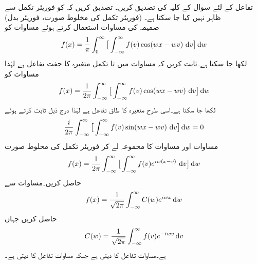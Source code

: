 \quad
تفاعل  کے لئے سوال  کے کلیہ کی تصدیق کریں۔ 
\quad
تصدیق کریں کہ  کو فوریئر تکمل سے ظاہر نہیں کیا جا سکتا ہے۔
\quad (فوریئر تکمل کی مخلوط صورت، فوریئر بدل)\\
ضمیمہ  کی مساوات  استعمال کرتے ہوئے مساوات  کو
\begin{align}\label{مساوات_فوریئر_بدل_الف}
f(x)=\frac{1}{\pi}\int_{0}^{\infty} \big[\int_{-\infty}^{\infty} f(v)\cos(wx-wv)\,\dif v\big]\dif w
\end{align}
لکھا جا سکتا ہے۔ثابت کریں کہ مساوات  میں  تا  تکمل متغیرہ  کا جفت تفاعل ہے لہٰذا مساوات  کو
\begin{align}\label{مساوات_فوریئر_بدل_ب}
f(x)=\frac{1}{2\pi}\int_{-\infty}^{\infty} \big[\int_{-\infty}^{\infty} f(v)\cos(wx-wv)\,\dif v\big]\dif w
\end{align}
لکھا جا سکتا ہے۔اسی طرح  متغیرہ  کا طاق تفاعل ہے لہٰذا درج ذیل ثابت کرتے ہوئے
\begin{align}\label{مساوات_فوریئر_بدل_پ}
\frac{i}{2\pi}\int_{-\infty}^{\infty} \big[\int_{-\infty}^{\infty} f(v)\sin(wx-wv)\,\dif v\big]\dif w=0
\end{align}
مساوات  اور مساوات  کا مجموعہ لے کر فوریئر تکمل کی مخلوط صورت
\begin{align}\label{مساوات_فوریئر_بدل_ت}
f(x)=\frac{1}{2\pi}\int_{-\infty}^{\infty} \big[\int_{-\infty}^{\infty} f(v)e^{iw(x-v)}\,\dif v\big]\dif w
\end{align}
حاصل کریں۔مساوات  سے 
\begin{align}\label{مساوات_فوریئر_بدل_ٹ}
f(x)=\frac{1}{\sqrt{2\pi}}\int_{-\infty}^{\infty} C(w)e^{iwx}\dif w
\end{align}
حاصل کریں جہاں
\begin{align}\label{مساوات_فوریئر_بدل_ث}
C(w)=\frac{1}{\sqrt{2\pi}}\int_{-\infty}^{\infty} f(v)e^{-iwv}\dif v
\end{align}
ہے۔مساوات  تفاعل  کا  دیتی ہے جبکہ مساوات  تفاعل  کا  دیتی ہے۔
